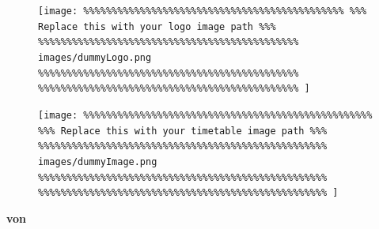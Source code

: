 
{%
\begin{titlepage}
	\centering
	\vspace*{-2mm}
	{\scshape \begin{figure}[h]
			\centering
			\texttt{[image: 
				\%\%\%\%\%\%\%\%\%\%\%\%\%\%\%\%\%\%\%\%\%\%\%\%\%\%\%\%\%\%\%\%\%\%\%\%\%\%\%\%\%\%\%\%\%\%
				\%\%\% Replace this with your logo image path \%\%\%
				\%\%\%\%\%\%\%\%\%\%\%\%\%\%\%\%\%\%\%\%\%\%\%\%\%\%\%\%\%\%\%\%\%\%\%\%\%\%\%\%\%\%\%\%\%\%
				images/dummyLogo.png
				\%\%\%\%\%\%\%\%\%\%\%\%\%\%\%\%\%\%\%\%\%\%\%\%\%\%\%\%\%\%\%\%\%\%\%\%\%\%\%\%\%\%\%\%\%\%
				\%\%\%\%\%\%\%\%\%\%\%\%\%\%\%\%\%\%\%\%\%\%\%\%\%\%\%\%\%\%\%\%\%\%\%\%\%\%\%\%\%\%\%\%\%\%
			]}
		\end{figure} \par}
	{\fontsize{16pt}{17.5}\selectfont\bfseries \thetitle\par}
	\vfill
	{\scshape \begin{figure}[h]
			\centering
			\texttt{[image: 
				\%\%\%\%\%\%\%\%\%\%\%\%\%\%\%\%\%\%\%\%\%\%\%\%\%\%\%\%\%\%\%\%\%\%\%\%\%\%\%\%\%\%\%\%\%\%\%\%\%\%\%
				\%\%\% Replace this with your timetable image path \%\%\%
				\%\%\%\%\%\%\%\%\%\%\%\%\%\%\%\%\%\%\%\%\%\%\%\%\%\%\%\%\%\%\%\%\%\%\%\%\%\%\%\%\%\%\%\%\%\%\%\%\%\%\%
				images/dummyImage.png
				\%\%\%\%\%\%\%\%\%\%\%\%\%\%\%\%\%\%\%\%\%\%\%\%\%\%\%\%\%\%\%\%\%\%\%\%\%\%\%\%\%\%\%\%\%\%\%\%\%\%\%
				\%\%\%\%\%\%\%\%\%\%\%\%\%\%\%\%\%\%\%\%\%\%\%\%\%\%\%\%\%\%\%\%\%\%\%\%\%\%\%\%\%\%\%\%\%\%\%\%\%\%\%
			]}
		\end{figure} \par}
	\vfill
	{\fontsize{10pt}{11.5}\selectfont\bfseries von\par \theauthor\par}
	\vfill
	\vspace*{5mm}
\end{titlepage}}